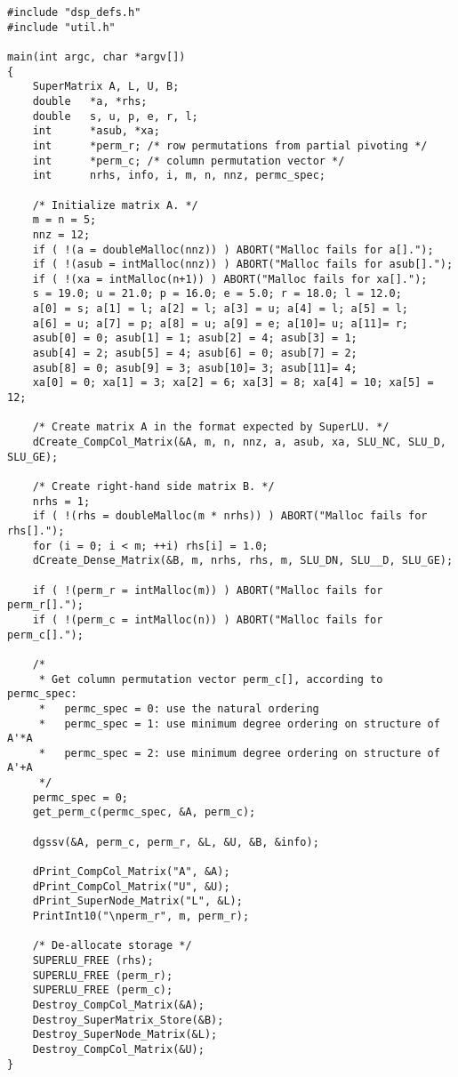 \begin{verbatim}
#include "dsp_defs.h"
#include "util.h"

main(int argc, char *argv[])
{
    SuperMatrix A, L, U, B;
    double   *a, *rhs;
    double   s, u, p, e, r, l;
    int      *asub, *xa;
    int      *perm_r; /* row permutations from partial pivoting */
    int      *perm_c; /* column permutation vector */
    int      nrhs, info, i, m, n, nnz, permc_spec;

    /* Initialize matrix A. */
    m = n = 5;
    nnz = 12;
    if ( !(a = doubleMalloc(nnz)) ) ABORT("Malloc fails for a[].");
    if ( !(asub = intMalloc(nnz)) ) ABORT("Malloc fails for asub[].");
    if ( !(xa = intMalloc(n+1)) ) ABORT("Malloc fails for xa[].");
    s = 19.0; u = 21.0; p = 16.0; e = 5.0; r = 18.0; l = 12.0;
    a[0] = s; a[1] = l; a[2] = l; a[3] = u; a[4] = l; a[5] = l;
    a[6] = u; a[7] = p; a[8] = u; a[9] = e; a[10]= u; a[11]= r;
    asub[0] = 0; asub[1] = 1; asub[2] = 4; asub[3] = 1;
    asub[4] = 2; asub[5] = 4; asub[6] = 0; asub[7] = 2;
    asub[8] = 0; asub[9] = 3; asub[10]= 3; asub[11]= 4;
    xa[0] = 0; xa[1] = 3; xa[2] = 6; xa[3] = 8; xa[4] = 10; xa[5] = 12;

    /* Create matrix A in the format expected by SuperLU. */
    dCreate_CompCol_Matrix(&A, m, n, nnz, a, asub, xa, SLU_NC, SLU_D, SLU_GE);
    
    /* Create right-hand side matrix B. */
    nrhs = 1;
    if ( !(rhs = doubleMalloc(m * nrhs)) ) ABORT("Malloc fails for rhs[].");
    for (i = 0; i < m; ++i) rhs[i] = 1.0;
    dCreate_Dense_Matrix(&B, m, nrhs, rhs, m, SLU_DN, SLU__D, SLU_GE);

    if ( !(perm_r = intMalloc(m)) ) ABORT("Malloc fails for perm_r[].");
    if ( !(perm_c = intMalloc(n)) ) ABORT("Malloc fails for perm_c[].");

    /*
     * Get column permutation vector perm_c[], according to permc_spec:
     *   permc_spec = 0: use the natural ordering 
     *   permc_spec = 1: use minimum degree ordering on structure of A'*A
     *   permc_spec = 2: use minimum degree ordering on structure of A'+A
     */    	
    permc_spec = 0;
    get_perm_c(permc_spec, &A, perm_c);

    dgssv(&A, perm_c, perm_r, &L, &U, &B, &info);
    
    dPrint_CompCol_Matrix("A", &A);
    dPrint_CompCol_Matrix("U", &U);
    dPrint_SuperNode_Matrix("L", &L);
    PrintInt10("\nperm_r", m, perm_r);

    /* De-allocate storage */
    SUPERLU_FREE (rhs);
    SUPERLU_FREE (perm_r);
    SUPERLU_FREE (perm_c);
    Destroy_CompCol_Matrix(&A);
    Destroy_SuperMatrix_Store(&B);
    Destroy_SuperNode_Matrix(&L);
    Destroy_CompCol_Matrix(&U);
}
\end{verbatim}



